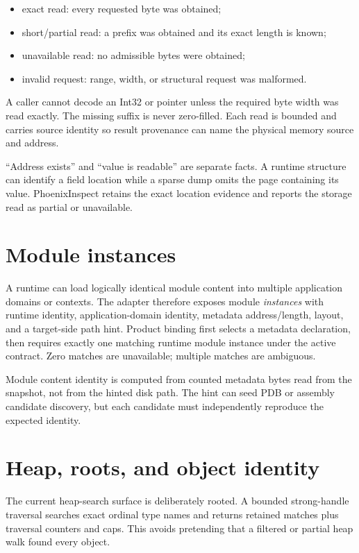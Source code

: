 \documentclass[11pt,oneside,openany]{book}
\begin{document}
\begin{itemize}
  \item exact read: every requested byte was obtained;
  \item short/partial read: a prefix was obtained and its exact length is known;
  \item unavailable read: no admissible bytes were obtained;
  \item invalid request: range, width, or structural request was malformed.
\end{itemize}

A caller cannot decode an Int32 or pointer unless the required byte width was read exactly. The missing suffix is never zero-filled. Each read is bounded and carries source identity so result provenance can name the physical memory source and address.

\begin{invariantbox}
``Address exists'' and ``value is readable'' are separate facts. A runtime structure can identify a field location while a sparse dump omits the page containing its value. PhoenixInspect retains the exact location evidence and reports the storage read as partial or unavailable.
\end{invariantbox}

\section{Module instances}

A runtime can load logically identical module content into multiple application domains or contexts. The adapter therefore exposes module \emph{instances} with runtime identity, application-domain identity, metadata address/length, layout, and a target-side path hint. Product binding first selects a metadata declaration, then requires exactly one matching runtime module instance under the active contract. Zero matches are unavailable; multiple matches are ambiguous.

Module content identity is computed from counted metadata bytes read from the snapshot, not from the hinted disk path. The hint can seed PDB or assembly candidate discovery, but each candidate must independently reproduce the expected identity.

\section{Heap, roots, and object identity}

The current heap-search surface is deliberately rooted. A bounded strong-handle traversal searches exact ordinal type names and returns retained matches plus traversal counters and caps. This avoids pretending that a filtered or partial heap walk found every object.
\end{document}
